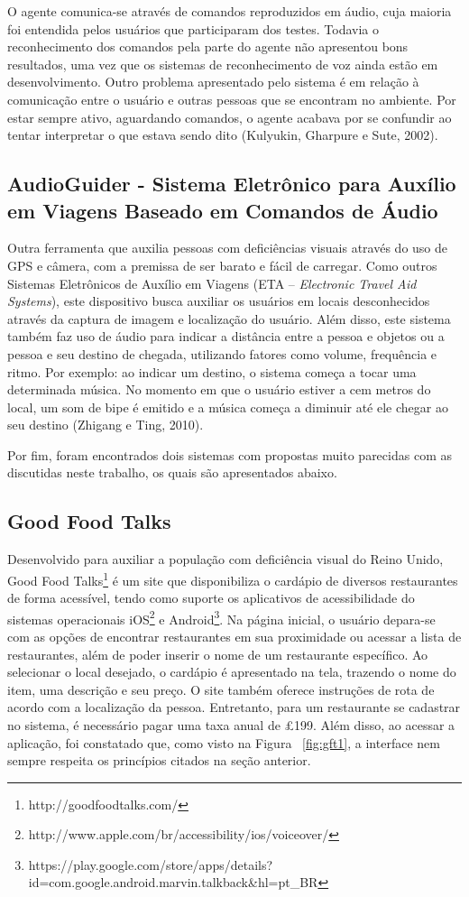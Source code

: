 O agente comunica-se através de comandos reproduzidos em áudio, cuja maioria foi entendida pelos usuários que participaram dos testes. Todavia o reconhecimento dos comandos pela parte do agente não apresentou bons resultados, uma vez que os sistemas de reconhecimento de voz ainda estão em desenvolvimento. Outro problema apresentado pelo sistema é em relação à comunicação entre o usuário e outras pessoas que se encontram no ambiente. Por estar sempre ativo, aguardando comandos, o agente acabava por se confundir ao tentar interpretar o que estava sendo dito (Kulyukin, Gharpure e Sute, 2002)\nocite{KULYUKIN2002}. 

\subsection{AudioGuider - Sistema Eletrônico para Auxílio em Viagens Baseado em Comandos de Áudio}
Outra ferramenta que auxilia pessoas com deficiências visuais através do uso de GPS e câmera, com a premissa de ser barato e fácil de carregar. Como outros Sistemas Eletrônicos de Auxílio em Viagens (ETA -- \emph{Electronic Travel Aid Systems}), este dispositivo busca auxiliar os usuários em locais desconhecidos através da captura de imagem e localização do usuário. Além disso, este sistema também faz uso de áudio para indicar a distância entre a pessoa e objetos ou a pessoa e seu destino de chegada, utilizando fatores como volume, frequência e ritmo. Por exemplo: ao indicar um destino, o sistema começa a tocar uma determinada música. No momento em que o usuário estiver a cem metros do local, um som de bipe é emitido e a música começa a diminuir até ele chegar ao seu destino (Zhigang e Ting, 2010)\nocite{ZHIGANG2010}.

\vspace{0.5cm}
Por fim, foram encontrados dois sistemas com propostas muito parecidas com as discutidas neste trabalho, os quais são apresentados abaixo.

\subsection{Good Food Talks}
Desenvolvido para auxiliar a população com deficiência visual do Reino Unido, Good Food Talks\footnote{http://goodfoodtalks.com/} é um site que disponibiliza o cardápio de diversos restaurantes de forma acessível, tendo como suporte os aplicativos de acessibilidade do sistemas operacionais iOS\footnote{http://www.apple.com/br/accessibility/ios/voiceover/} e Android\footnote{https://play.google.com/store/apps/details?id=com.google.android.marvin.talkback\&hl=pt\_BR}. Na página inicial, o usuário depara-se com as opções de encontrar restaurantes em sua proximidade ou acessar a lista de restaurantes, além de poder inserir o nome de um restaurante específico. Ao selecionar o local desejado, o cardápio é apresentado na tela, trazendo o nome do item, uma descrição e seu preço. O site também oferece instruções de rota de acordo com a localização da pessoa. Entretanto, para um restaurante se cadastrar no sistema, é necessário pagar uma taxa anual de £199. Além disso, ao acessar a aplicação, foi constatado que, como visto na Figura ~\ref{fig:gft1}, a interface nem sempre respeita os princípios citados na seção anterior.

